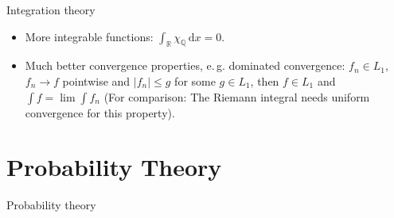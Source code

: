 \documentclass{beamer}
\newcommand{\RR}{\mathbb{R}}
\newcommand{\QQ}{\mathbb{Q}}
\newcommand{\td}{\,\mathrm{d}}  %
\begin{document}
\begin{frame}{Integration theory}
  \begin{itemize}
  \item More integrable functions: $\int_\RR \chi_\QQ \td x= 0$.
  \item Much better convergence properties, e.\,g. dominated convergence: $f_n
    \in L_1$, $f_n \to f$ pointwise and $|f_n|\leq g$ for some $g \in L_1$, then
    $f \in L_1$ and $\int f = \lim \int f_n$ (For comparison: The Riemann
    integral needs uniform convergence for this property).
  \end{itemize}
\end{frame}

\section{Probability Theory}

\begin{frame}{Probability theory}
  
\end{frame}
\end{document}
